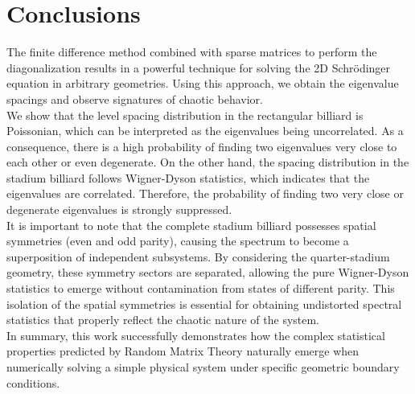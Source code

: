 
\section{Conclusions}

The finite difference method combined with sparse matrices to perform the diagonalization results in a powerful technique for solving the 2D Schrödinger equation in arbitrary geometries. Using this approach, we obtain the eigenvalue spacings and observe signatures of chaotic behavior. \\

We show that the level spacing distribution in the rectangular billiard is Poissonian, which can be interpreted as the eigenvalues being uncorrelated. As a consequence, there is a high probability of finding two eigenvalues very close to each other or even degenerate. On the other hand, the spacing distribution in the stadium billiard follows Wigner-Dyson statistics, which indicates that the eigenvalues are correlated. Therefore, the probability of finding two very close or degenerate eigenvalues is strongly suppressed. \\

It is important to note that the complete stadium billiard possesses spatial symmetries (even and odd parity), causing the spectrum to become a superposition of independent subsystems. By considering the quarter-stadium geometry, these symmetry sectors are separated, allowing the pure Wigner-Dyson statistics to emerge without contamination from states of different parity. This isolation of the spatial symmetries is essential for obtaining undistorted spectral statistics that properly reflect the chaotic nature of the system. \\

In summary, this work successfully demonstrates how the complex statistical properties predicted by Random Matrix Theory naturally emerge when numerically solving a simple physical system under specific geometric boundary conditions.

